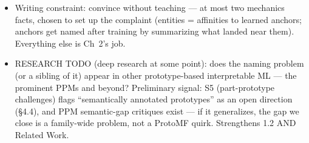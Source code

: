 \begin{itemize}
    \item Writing constraint: convince without teaching — at most two mechanics facts, chosen to set up the complaint (entities = affinities to learned anchors; anchors get named after training by summarizing what landed near them). Everything else is Ch~2's job.
    \item RESEARCH TODO (deep research at some point): does the naming problem (or a sibling of it) appear in other prototype-based interpretable ML — the prominent PPMs and beyond? Preliminary signal: S5 (part-prototype challenges) flags ``semantically annotated prototypes'' as an open direction (§4.4), and PPM semantic-gap critiques exist — if it generalizes, the gap we close is a family-wide problem, not a ProtoMF quirk. Strengthens 1.2 AND Related Work.
\end{itemize}

